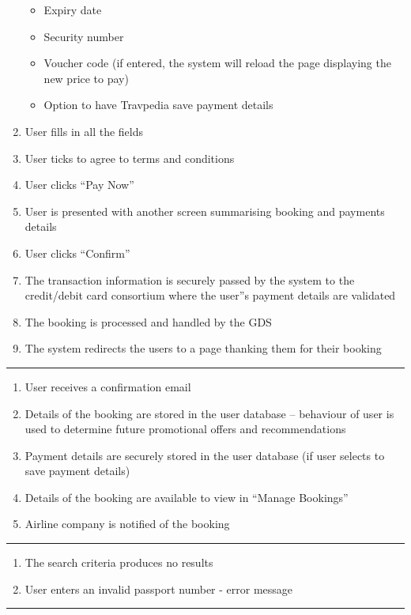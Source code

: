\begin{enumerate}
\begin{itemize}
		\item Expiry date
		\item Security number
		\item Voucher code (if entered, the system will reload the page
			displaying the new price to pay)
		\item Option to have Travpedia save payment  details
	\end{itemize}
	\item User fills in all the fields
	\item User ticks to agree to terms and conditions
	\item User clicks ``Pay Now''
	\item User is presented with another screen summarising booking and
		payments details
	\item User clicks ``Confirm''
	\item The transaction information is securely passed by the system to the
		credit/debit card consortium where the user''s payment details are
		validated
	\item The booking is processed and handled by the GDS
	\item The system redirects the users to a page thanking them for their
		booking
\end{enumerate}
\noindent\rule{\textwidth}{0.6pt}

\begin{enumerate}
	\item User receives a confirmation email
	\item Details of the booking are stored in the user database – behaviour of
		user is used to determine future promotional offers and recommendations
	\item Payment details are securely stored in the user database (if user
		selects to save payment details)
	\item Details of the booking are available to view in ``Manage Bookings''
	\item Airline company is notified of the booking
\end{enumerate}
\noindent\rule{\textwidth}{0.6pt}

\begin{enumerate}
	\item The search criteria produces no results
	\item User enters an invalid passport number - error message
\end{enumerate}
\noindent\rule{\textwidth}{0.6pt}

